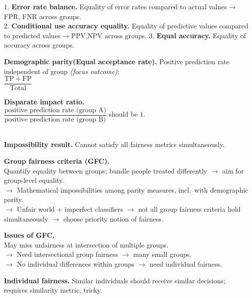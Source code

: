\documentclass[8pt, a4paper]{extarticle}
\begin{document}
\begin{minipage}[t]{0.49\textwidth}
{\begin{minipage}[t]{1\textwidth}
			1. \textbf{Error rate balance.} Equality of error rates compared to actual values$\to$FPR, FNR across groups.\\
			2. \textbf{Conditional use accuracy equality.} Equality of predictive values compared to predicted values$\to$PPV,NPV across groups.
			3. \textbf{Equal accuracy.} Equality of accuracy across groups.\\
			\begin{minipage}[t]{0.5\textwidth}
				\textbf{Demographic parity(Equal acceptance rate).} Positive prediction rate independent of group \textit{(focus outcome)}:\\\centering
				\(\dfrac{\mathrm{TP}+\mathrm{FP}}{\mathrm{Total}}\)
			\end{minipage}\hfill
			\begin{minipage}[t]{0.48\textwidth}
				\textbf{Disparate impact ratio.} \\
				$\dfrac{\text{positive prediction rate (group A)}}{\text{positive prediction rate (group B)}}$ should be \(1\).
			\end{minipage}\\
			\textbf{Impossibility result.} Cannot satisfy all fairness metrics simultaneously.\\
			\begin{minipage}[htp]{0.6\textwidth}
				\textbf{Group fairness criteria (GFC).} \\
				Quantify equality between groups; bundle people treated differently \(\rightarrow\) aim for group-level equality.\\
				\(\rightarrow\) Mathematical impossibilities among parity measures, incl.\ with demographic parity.\\
				\(\rightarrow\) Unfair world + imperfect classifiers \(\rightarrow\) not all group fairness criteria hold simultaneously \(\rightarrow\) choose priority notion of fairness.
			\end{minipage}
			\begin{minipage}[htp]{0.38\textwidth}
				\textbf{Issues of GFC.} \\
				May miss unfairness at intersection of multiple groups.\\
				\(\rightarrow\) Need intersectional group fairness \(\rightarrow\) many small groups.\\
				\(\rightarrow\) No individual differences within groups \(\rightarrow\) need individual fairness.
			\end{minipage}
			\textbf{Individual fairness.} Similar individuals should receive similar decisions; requires similarity metric, tricky.\\

\end{minipage}}
\end{minipage}
\end{document}

